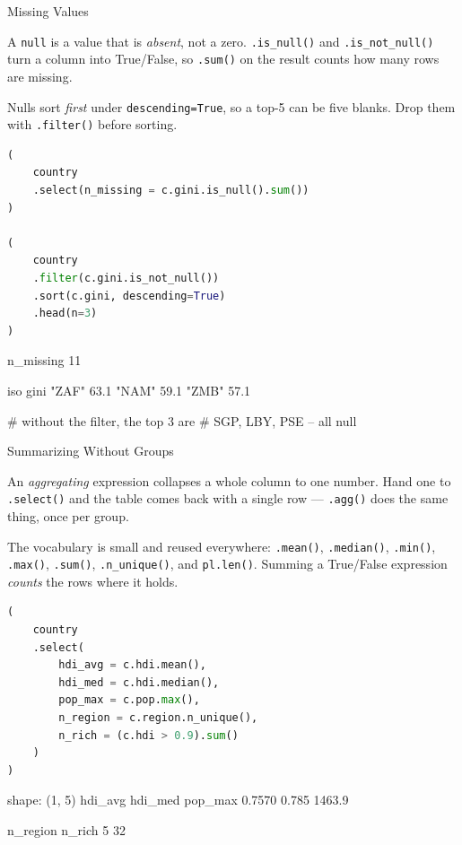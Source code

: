 \documentclass[8pt,aspectratio=169]{beamer}
\begin{document}
\begin{frame}[fragile]{Missing Values}
\begin{splitcode}{%

A \texttt{null} is a value that is \textit{absent}, not a zero. \texttt{.is\_null()} and \texttt{.is\_not\_null()} turn a column into True/False, so \texttt{.sum()} on the result counts how many rows are missing.

Nulls sort \textit{first} under \texttt{descending=True}, so a top-5 can be five blanks. Drop them with \texttt{.filter()} before sorting.

}
\begin{lstlisting}[language=Python]
(
    country
    .select(n_missing = c.gini.is_null().sum())
)

(
    country
    .filter(c.gini.is_not_null())
    .sort(c.gini, descending=True)
    .head(n=3)
)
\end{lstlisting}
\begin{codeoutput}
n_missing
11

iso    gini
"ZAF"  63.1
"NAM"  59.1
"ZMB"  57.1

# without the filter, the top 3 are
# SGP, LBY, PSE -- all null
\end{codeoutput}
\end{splitcode}
\end{frame}

\begin{frame}[fragile]{Summarizing Without Groups}
\begin{splitcode}{%

An \textit{aggregating} expression collapses a whole column to one number. Hand one to \texttt{.select()} and the table comes back with a single row --- \texttt{.agg()} does the same thing, once per group.

The vocabulary is small and reused everywhere: \texttt{.mean()}, \texttt{.median()}, \texttt{.min()}, \texttt{.max()}, \texttt{.sum()}, \texttt{.n\_unique()}, and \texttt{pl.len()}. Summing a True/False expression \textit{counts} the rows where it holds.

}
\begin{lstlisting}[language=Python]
(
    country
    .select(
        hdi_avg = c.hdi.mean(),
        hdi_med = c.hdi.median(),
        pop_max = c.pop.max(),
        n_region = c.region.n_unique(),
        n_rich = (c.hdi > 0.9).sum()
    )
)
\end{lstlisting}
\begin{codeoutput}
shape: (1, 5)
hdi_avg  hdi_med  pop_max
0.7570   0.785    1463.9

n_region  n_rich
5         32
\end{codeoutput}
\end{splitcode}
\end{frame}
\end{document}
